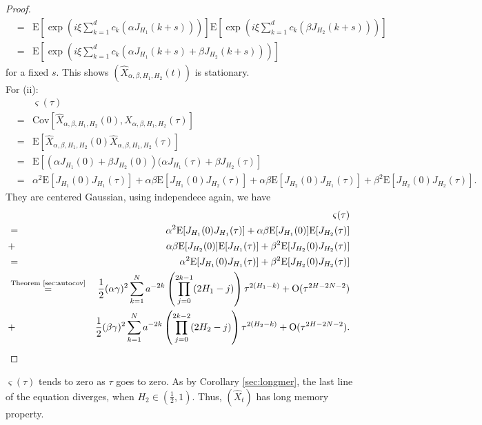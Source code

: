 \documentclass[a4paper, twoside, 11pt]{article}
\theoremstyle{definition}
\newcommand{\brkt}[1]{\left({#1} \right)}
\begin{document}
\begin{proof}
\begin{eqnarray*}
   &=& \mathrm{E}[\exp(i\xi\sum\limits_{k=1}^{d} c_k (\alpha J_{H_1}(k+s)))]\mathrm{E}[\exp(i\xi\sum\limits_{k=1}^{d} c_k (\beta J_{H_2}(k+s)))] \\
   &=& \mathrm{E}[\exp(i\xi\sum\limits_{k=1}^{d} c_k (\alpha J_{H_1}(k+s) + \beta J_{H_2}(k+s)))]
  \end{eqnarray*}
  for a fixed $s$. This shows $(\hat{X}_{\alpha,\beta,H_1,H_2}(t))$ is stationary.\\
  For (ii): 
  \begin{eqnarray*}
	&&\varsigma(\tau) \\
	&=& \mathrm{Cov}[\hat{X}_{\alpha,\beta,H_1,H_2}(0), \hat{X}_{\alpha,\beta,H_1,H_2}(\tau)]\\
	&=& \mathrm{E}[\hat{X}_{\alpha,\beta,H_1,H_2}(0) \hat{X}_{\alpha,\beta,H_1,H_2}(\tau)]\\
	&=& \mathrm{E}[(\alpha J_{H_1}(0) + \beta J_{H_2}(0))(\alpha J_{H_1}(\tau) + \beta J_{H_2}(\tau)]\\
	&=& \alpha^2\mathrm{E}[J_{H_1}(0) J_{H_1}(\tau)] + \alpha\beta\mathrm{E}[J_{H_1}(0)J_{H_2}(\tau)] + \alpha\beta\mathrm{E}[J_{H_2}(0)J_{H_1}(\tau)] + \beta^2\mathrm{E}[J_{H_2}(0)J_{H_2}(\tau)].
  \end{eqnarray*}
   They are centered Gaussian, using independece again, we have
  \begin{eqnarray*}
	&&\varsigma(\tau) \\
	&=& \alpha^2\mathrm{E}[J_{H_1}(0) J_{H_1}(\tau)] + \alpha\beta\mathrm{E}[J_{H_1}(0)]\mathrm{E}[J_{H_2}(\tau)] \\
	&+& \alpha\beta\mathrm{E}[J_{H_2}(0)]\mathrm{E}[J_{H_1}(\tau)] + \beta^2\mathrm{E}[J_{H_2}(0)J_{H_2}(\tau)]\\
	&=& \alpha^2\mathrm{E}[J_{H_1}(0) J_{H_1}(\tau)] + \beta^2\mathrm{E}[J_{H_2}(0)J_{H_2}(\tau)]\\
	&\overset{\text{Theorem \ref{sec:autocov}}}{=}& \frac{1}{2} (\alpha\gamma)^2 \sum_{k=1}^{N} a^{-2k}\brkt{\prod_{j=0}^{2k-1}(2H_1-j)}\tau^{2(H_1-k)} + \mathrm{O}(\tau^{{2H-2N-2}})\\
  &+& \frac{1}{2} (\beta\gamma)^2 \sum_{k=1}^{N} a^{-2k}\brkt{\prod_{j=0}^{2k-2}(2H_2-j)}\tau^{2(H_2-k)} + \mathrm{O}(\tau^{{2H-2N-2}}).
  \end{eqnarray*}
  \end{proof}
  $\varsigma(\tau)$ tends to zero as $\tau$ goes to zero. As by Corollary \ref{sec:longmer},  the last line of the equation diverges, when $H_2 \in (\frac{1}{2}, 1)$. Thus, $(\hat{X}_t)$ has long memory property. 
\end{document}
